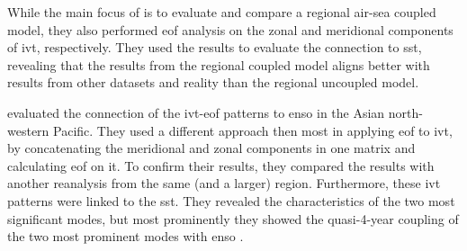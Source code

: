 While the main focus of \cite{yao_simulation_2013} is to evaluate and compare a regional air-sea coupled model, they also performed \ac{eof} analysis on the zonal and meridional components of \ac{ivt}, respectively. 
They used the results to evaluate the connection to \ac{sst}, revealing that the results from the regional coupled model aligns better with results from other datasets and reality than the regional uncoupled model. 


\citeauthor{li_quasi-4-yr_2012} evaluated the connection of the \ac{ivt}-\ac{eof} patterns to \ac{enso} in the Asian north-western Pacific.
They used a different approach then most in applying \ac{eof} to \ac{ivt}, by concatenating the meridional and zonal components in one matrix and calculating \ac{eof} on it. 
To confirm their results, they compared the results with another reanalysis from the same (and a larger) region. 
Furthermore, these \ac{ivt} patterns were linked to the \ac{sst}. 
They revealed the characteristics of the two most significant modes, but most prominently they showed the quasi-4-year coupling of the two most prominent modes with \ac{enso} \cite{li_quasi-4-yr_2012}. 



